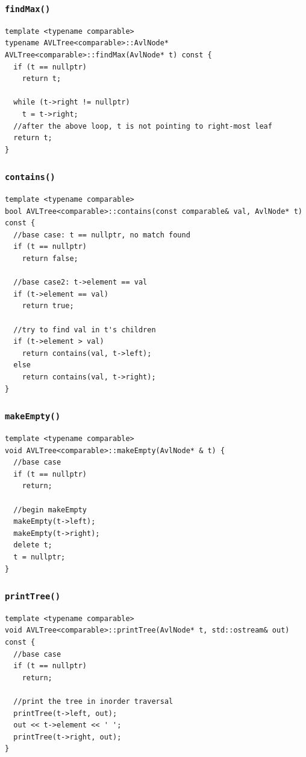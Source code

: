 \documentclass[11pt]{book}
\begin{document}
\subsubsection{\texttt{findMax()}}
\label{sec:org02be89c}
\begin{verbatim}
template <typename comparable>
typename AVLTree<comparable>::AvlNode* AVLTree<comparable>::findMax(AvlNode* t) const {
  if (t == nullptr)
    return t;

  while (t->right != nullptr)
    t = t->right;
  //after the above loop, t is not pointing to right-most leaf
  return t;   
}
\end{verbatim}
\subsubsection{\texttt{contains()}}
\label{sec:org5620db0}
\begin{verbatim}
template <typename comparable>
bool AVLTree<comparable>::contains(const comparable& val, AvlNode* t) const {
  //base case: t == nullptr, no match found
  if (t == nullptr)
    return false;

  //base case2: t->element == val
  if (t->element == val)
    return true;

  //try to find val in t's children
  if (t->element > val)
    return contains(val, t->left);
  else 
    return contains(val, t->right);
}
\end{verbatim}
\subsubsection{\texttt{makeEmpty()}}
\label{sec:org1066456}
\begin{verbatim}
template <typename comparable>
void AVLTree<comparable>::makeEmpty(AvlNode* & t) {
  //base case 
  if (t == nullptr)
    return;

  //begin makeEmpty
  makeEmpty(t->left);
  makeEmpty(t->right);
  delete t;
  t = nullptr;
}
\end{verbatim}
\subsubsection{\texttt{printTree()}}
\label{sec:orgdb1c5ec}
\begin{verbatim}
template <typename comparable>
void AVLTree<comparable>::printTree(AvlNode* t, std::ostream& out) const {
  //base case 
  if (t == nullptr)
    return;

  //print the tree in inorder traversal
  printTree(t->left, out);
  out << t->element << ' ';
  printTree(t->right, out);
}
\end{verbatim}
\end{document}
